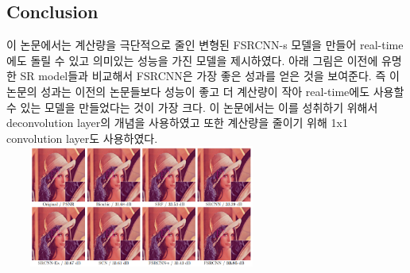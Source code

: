 \documentclass[extendedabs]{bmvc2k}
\begin{document}
\subsection{Conclusion}
 이 논문에서는 계산량을 극단적으로 줄인 변형된 FSRCNN-s 모델을 만들어 real-time에도 돌릴 수 있고 의미있는 성능을 가진 모델을 제시하였다.
 아래 그림은 이전에 유명한 SR model들과 비교해서 FSRCNN은 가장 좋은 성과를 얻은 것을 보여준다.
 즉 이 논문의 성과는 이전의 논문들보다 성능이 좋고 더 계산량이 작아 real-time에도 사용할 수 있는 모델을 만들었다는 것이 가장 크다. 이 논문에서는 이를 성취하기 위해서
 deconvolution layer의 개념을 사용하였고 또한 계산량을 줄이기 위해 1x1 convolution layer도 사용하였다. 
 \newline \includegraphics[width=9cm, height=4cm]{images/09_SR.PNG}

\newpage

\end{document}
